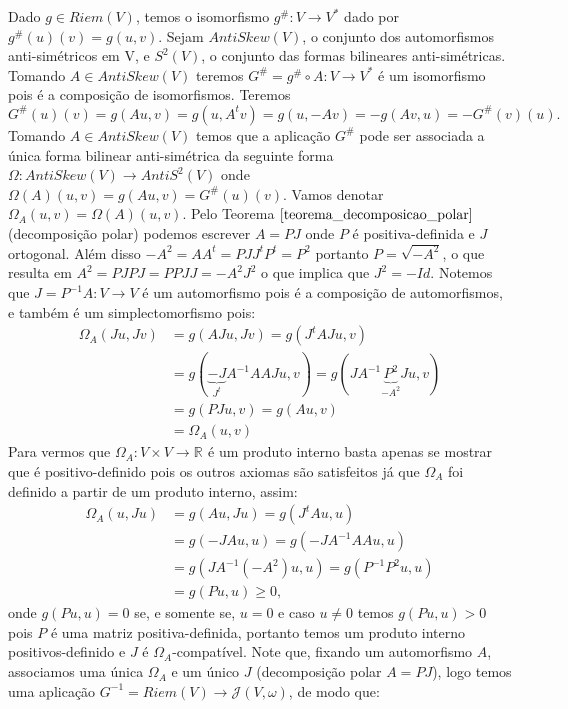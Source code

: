 \documentclass[12pt]{book}
\newcommand{\estruturascomplexaspadrao}{\mathcal{J}(V, \omega)}
\newcommand{\matrizantisimetrica}[1]{AntiSkew(#1)}
\newcommand{\produtosinternos}[1]{Riem(#1)}
\newcommand{\real}[1]{\mathbb{R}^{#1}}
\newcommand{\vermelho}[1]{{\color{red}#1}}
\begin{document}
	Dado $g \in \produtosinternos{V}$, temos o isomorfismo $g^{\#}:V \to V^{*}$ dado por $g^{\#}(u)(v) = g(u,v)$. Sejam $\matrizantisimetrica{V}$, o conjunto dos automorfismos anti-simétricos em V, e $S^{2}(V)$, o conjunto das formas bilineares anti-simétricas. Tomando $A \in \matrizantisimetrica{V}$ teremos $G^{\#} = g^{\#}\circ A:V\to V^{*}$ é um isomorfismo pois é a composição de isomorfismos. Teremos 
	$$
	G^{\#}(u)(v)=g(Au,v) = g(u,A^{t}v) = g(u,-Av) = -g(Av,u) = -G^{\#}(v)(u).
	$$
	Tomando $A\in \matrizantisimetrica{V}$ temos que a aplicação $G^{\#}$ pode ser associada a única forma bilinear anti-simétrica da seguinte forma $\Omega : \matrizantisimetrica{V} \to AntiS^{2}(V)$ onde $\Omega(A)(u,v)  = g(Au,v)= G^{\#}(u)(v)$. Vamos denotar $\Omega_{A}(u,v) = \Omega(A)(u,v)$. Pelo Teorema $\ref{teorema_decomposicao_polar}$ (decomposição polar) podemos escrever $A = PJ$ onde $P$ é positiva-definida e $J$ ortogonal. Além disso $-A^{2}=AA^{t} = PJJ^{t}P^{t} = P^{2}$ portanto $P=\sqrt{-A^{2}}$, \vermelho{o que resulta em $A^{2} = PJPJ = PPJJ = -A^{2}J^{2}$ o que implica que $J^{2} = -Id$.} Notemos que $J=P^{-1}A:V \to V$ é um automorfismo pois é a composição de automorfismos, e também é um simplectomorfismo pois:
	$$
	\begin{aligned}
		\Omega_{A}(Ju,Jv) &= g(AJu, Jv)= g(J^{t}AJu, v)
		\\
		&=g(\underbrace{-J}_{J^{t}}A^{-1}AAJu, v) = g(JA^{-1}\underbrace{P^{2}}_{-A^{2}}Ju, v)
		\\
		&=g(PJu, v) = g(Au, v)
		\\
		&=\Omega_{A}(u,v)
	\end{aligned}
	$$
	Para vermos que $\Omega_{A}:V\times V\to \real{}$ é um produto interno basta apenas se mostrar que é positivo-definido pois os outros axiomas são satisfeitos já que $\Omega_{A}$ foi definido a partir de um produto interno, assim:
	$$
	\begin{aligned}
	\Omega_{A}(u,Ju) &= g(Au, Ju)= g(J^{t}Au, u)
	\\
	&=g(-JAu, u)=g(-JA^{-1}AAu, u)
	\\
	&=g(JA^{-1}(-A^{2})u, u)=g(P^{-1}P^{2}u, u)
	\\
	&=g(Pu, u)\geq 0,
	\end{aligned}
	$$ 
	onde $g(Pu, u)=0$ se, e somente se, $u=0$ e caso $u\neq 0$ temos $g(Pu, u)>0$ pois $P$ é uma matriz positiva-definida, portanto temos um produto interno positivos-definido e $J$ é $\Omega_{A}$-compatível. Note que, fixando um automorfismo $A$, associamos uma única $\Omega_{A}$ e um único $J$ (decomposição polar $A=PJ$), logo temos uma aplicação $G^{-1} = \produtosinternos{V}\to \estruturascomplexaspadrao$, de modo que:
	
\end{document}
